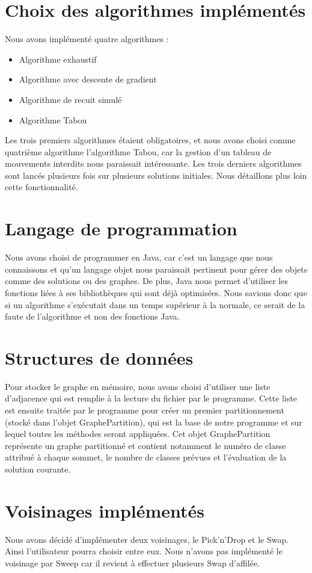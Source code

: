 \documentclass[12pt]{article}
\begin{document}
\section{Choix des algorithmes implémentés}
Nous avons implémenté quatre algorithmes :
	\begin{itemize}
    \item Algorithme exhaustif
    \item Algorithme avec descente de gradient
	\item Algorithme de recuit simulé
	\item Algorithme Tabou
	\end{itemize}
Les trois premiers algorithmes étaient obligatoires, et nous avons choisi comme quatrième algorithme l’algorithme Tabou, car la gestion d’un tableau de mouvements interdits nous paraissait intéressante.
Les trois derniers algorithmes sont lancés plusieurs fois sur plusieurs solutions initiales. Nous détaillons plus loin cette fonctionnalité.

\section{Langage de programmation}
    Nous avons choisi de programmer en Java, car c’est un langage que nous connaissons et qu’un langage objet nous paraissait pertinent pour gérer des objets comme des solutions ou des graphes. De plus, Java nous permet d’utiliser les fonctions liées à ses bibliothèques qui sont déjà optimisées. Nous savions donc que si un algorithme s’exécutait dans un temps supérieur à la normale, ce serait de la faute de l’algorithme et non des fonctions Java.

\section{Structures de données}
Pour stocker le graphe en mémoire, nous avons choisi d’utiliser une liste d’adjacence qui est remplie à la lecture du fichier par le programme. Cette liste est ensuite traitée par le programme pour créer un premier partitionnement (stocké dans l’objet GraphePartition), qui est la base de notre programme et sur lequel toutes les méthodes seront appliquées. Cet objet GraphePartition représente un graphe partitionné et contient notamment le numéro de classe attribué à chaque sommet, le nombre de classes prévues et l’évaluation de la solution courante.

\section{Voisinages implémentés}
Nous avons décidé d’implémenter deux voisinages, le Pick’n'Drop et le Swap. Ainsi l’utilisateur pourra choisir entre eux.
    Nous n’avons pas implémenté le voisinage par Sweep car il revient à effectuer plusieurs Swap d’affilée.
\end{document}
